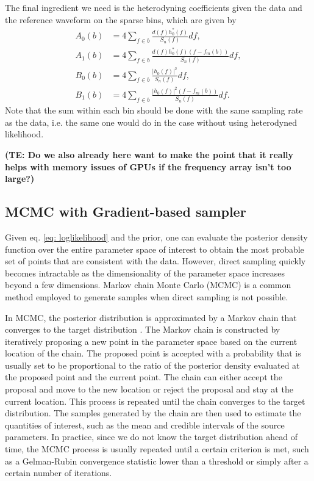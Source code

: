 \documentclass[twocolumn]{aastex631}
\newcommand{\te}[1]{\textbf{\color{pyRed}(TE: #1)}}
\begin{document}
The final ingredient we need is the heterodyning coefficients given the data and
the reference waveform on the sparse bins, which are given by
\begin{align}
    A_0(b) &= 4 \sum_{f \in b} \frac{d(f)h^*_0(f)}{S_n(f)} df, \\
    A_1(b) &= 4 \sum_{f \in b} \frac{d(f)h^*_0(f)(f-f_m(b))}{S_n(f)} df, \\
    B_0(b) &= 4 \sum_{f \in b} \frac{|h_0(f)|^2}{S_n(f)} df, \\
    B_1(b) &= 4 \sum_{f \in b} \frac{|h_0(f)|^2(f-f_m(b))}{S_n(f)} df.
\end{align}
Note that the sum within each bin should be done with the same sampling rate as
the data, i.e. the same one would do in the case without using heterodyned
likelihood.

\te{Do we also already here want to make the point that it really helps with memory issues of GPUs if the frequency array isn't too large?}

\subsection{MCMC with Gradient-based sampler}
\label{sec:gradient}

Given eq. \ref{eq: loglikelihood} and the prior, one can evaluate the posterior
density function over the entire parameter space of interest to obtain the most
probable set of points that are consistent with the data. However, direct
sampling quickly becomes intractable as the dimensionality of the parameter
space increases beyond a few dimensions. Markov chain Monte Carlo (MCMC)
\cite{gelmanbda04} is a common method employed to generate samples when direct
sampling is not possible.

In MCMC, the posterior distribution is approximated by a Markov chain that
converges to the target distribution \cite{10.1214/aos/1176325750}. The Markov
chain is constructed by iteratively proposing a new point in the parameter space
based on the current location of the chain. The proposed point is accepted with
a probability that is usually set to be proportional to the ratio of the
posterior density evaluated at the proposed point and the current point. The
chain can either accept the proposal and move to the new location or reject the
proposal and stay at the current location. This process is repeated until the
chain converges to the target distribution. The samples generated by the chain
are then used to estimate the quantities of interest, such as the mean and
credible intervals of the source parameters. In practice, since we do not know
the target distribution ahead of time, the MCMC process is usually repeated
until a certain criterion is met, such as a Gelman-Rubin convergence statistic
\cite{10.2307/2246093} lower than a threshold or simply after a certain number
of iterations.
\end{document}
